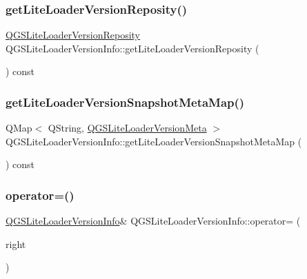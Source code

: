 \subsubsection{\texorpdfstring{get\+Lite\+Loader\+Version\+Reposity()}{getLiteLoaderVersionReposity()}}
{\footnotesize\ttfamily \mbox{\hyperlink{class_q_g_s_lite_loader_version_reposity}{Q\+G\+S\+Lite\+Loader\+Version\+Reposity}} Q\+G\+S\+Lite\+Loader\+Version\+Info\+::get\+Lite\+Loader\+Version\+Reposity (\begin{DoxyParamCaption}{ }\end{DoxyParamCaption}) const}

\mbox{\label{class_q_g_s_lite_loader_version_info_af4bd384dba3ccd5e894da4249ccdbbcc}} 
\subsubsection{\texorpdfstring{get\+Lite\+Loader\+Version\+Snapshot\+Meta\+Map()}{getLiteLoaderVersionSnapshotMetaMap()}}
{\footnotesize\ttfamily Q\+Map$<$ Q\+String, \mbox{\hyperlink{class_q_g_s_lite_loader_version_meta}{Q\+G\+S\+Lite\+Loader\+Version\+Meta}} $>$ Q\+G\+S\+Lite\+Loader\+Version\+Info\+::get\+Lite\+Loader\+Version\+Snapshot\+Meta\+Map (\begin{DoxyParamCaption}{ }\end{DoxyParamCaption}) const}

\mbox{\label{class_q_g_s_lite_loader_version_info_a3d8a63a8bcb4e92f0d2af7a95ff56ba0}} 
\subsubsection{\texorpdfstring{operator=()}{operator=()}\hspace{0.1cm}{\footnotesize\ttfamily [1/2]}}
{\footnotesize\ttfamily \mbox{\hyperlink{class_q_g_s_lite_loader_version_info}{Q\+G\+S\+Lite\+Loader\+Version\+Info}}\& Q\+G\+S\+Lite\+Loader\+Version\+Info\+::operator= (\begin{DoxyParamCaption}\item[{const \mbox{\hyperlink{class_q_g_s_lite_loader_version_info}{Q\+G\+S\+Lite\+Loader\+Version\+Info}} \&}]{right }\end{DoxyParamCaption})\hspace{0.3cm}{\ttfamily [default]}}

